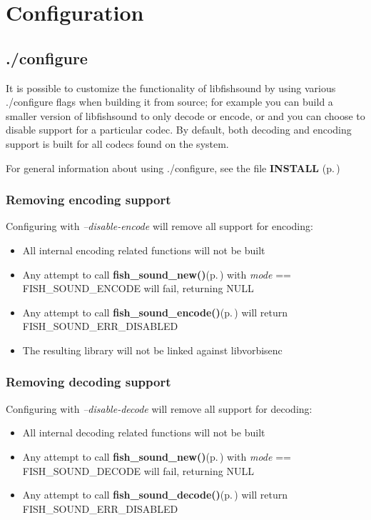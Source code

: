 \section{Configuration}
\label{group__configuration}
\subsection{./configure}\label{configure}
It is possible to customize the functionality of libfishsound by using various ./configure flags when building it from source; for example you can build a smaller version of libfishsound to only decode or encode, or and you can choose to disable support for a particular codec. By default, both decoding and encoding support is built for all codecs found on the system.

For general information about using ./configure, see the file {\bf INSTALL }{\rm (p.\,\pageref{group__install})}\subsubsection{Removing encoding support}\label{no_encode}
Configuring with {\em --disable-encode\/} will remove all support for encoding:\begin{itemize}
\item All internal encoding related functions will not be built\item Any attempt to call {\bf fish\_\-sound\_\-new()}{\rm (p.\,\pageref{fishsound_8h_a4})} with {\em mode\/} == FISH\_\-SOUND\_\-ENCODE will fail, returning NULL\item Any attempt to call {\bf fish\_\-sound\_\-encode()}{\rm (p.\,\pageref{fishsound_8h_a8})} will return FISH\_\-SOUND\_\-ERR\_\-DISABLED\item The resulting library will not be linked against libvorbisenc\end{itemize}
\subsubsection{Removing decoding support}\label{no_decode}
Configuring with {\em --disable-decode\/} will remove all support for decoding:\begin{itemize}
\item All internal decoding related functions will not be built\item Any attempt to call {\bf fish\_\-sound\_\-new()}{\rm (p.\,\pageref{fishsound_8h_a4})} with {\em mode\/} == FISH\_\-SOUND\_\-DECODE will fail, returning NULL\item Any attempt to call {\bf fish\_\-sound\_\-decode()}{\rm (p.\,\pageref{fishsound_8h_a7})} will return FISH\_\-SOUND\_\-ERR\_\-DISABLED\end{itemize}
